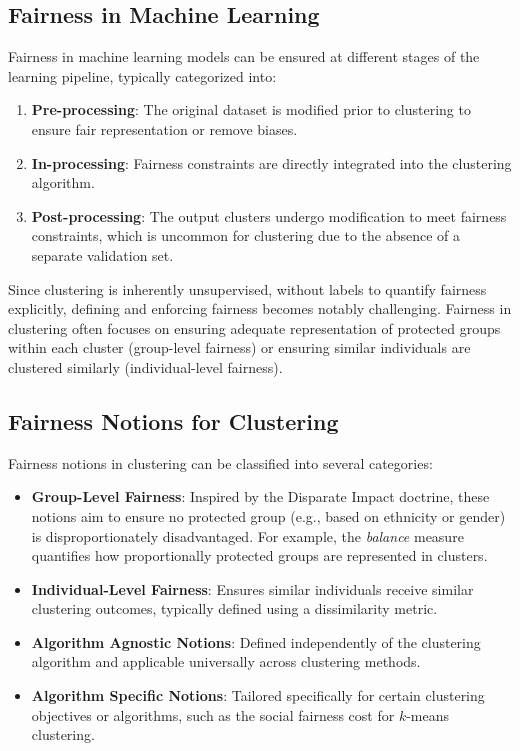 \subsection{Fairness in Machine Learning}
Fairness in machine learning models can be ensured at different stages of the learning pipeline, typically categorized into:

\begin{enumerate}
    \item \textbf{Pre-processing}: The original dataset is modified prior to clustering to ensure fair representation or remove biases.
    \item \textbf{In-processing}: Fairness constraints are directly integrated into the clustering algorithm.
    \item \textbf{Post-processing}: The output clusters undergo modification to meet fairness constraints, which is uncommon for clustering due to the absence of a separate validation set.
\end{enumerate}

Since clustering is inherently unsupervised, without labels to quantify fairness explicitly, defining and enforcing fairness becomes notably challenging. Fairness in clustering often focuses on ensuring adequate representation of protected groups within each cluster (group-level fairness) or ensuring similar individuals are clustered similarly (individual-level fairness).

\subsection{Fairness Notions for Clustering}
Fairness notions in clustering can be classified into several categories:

\begin{itemize}
    \item \textbf{Group-Level Fairness}: Inspired by the Disparate Impact doctrine, these notions aim to ensure no protected group (e.g., based on ethnicity or gender) is disproportionately disadvantaged. For example, the \emph{balance} measure quantifies how proportionally protected groups are represented in clusters.

    \item \textbf{Individual-Level Fairness}: Ensures similar individuals receive similar clustering outcomes, typically defined using a dissimilarity metric.

    \item \textbf{Algorithm Agnostic Notions}: Defined independently of the clustering algorithm and applicable universally across clustering methods.

    \item \textbf{Algorithm Specific Notions}: Tailored specifically for certain clustering objectives or algorithms, such as the social fairness cost for \(k\)-means clustering.
\end{itemize}

